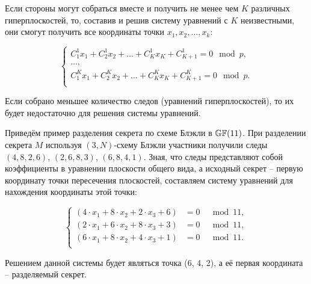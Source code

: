 Если стороны могут собраться вместе и получить не менее чем $K$ различных гиперплоскостей, то, составив и решив систему уравнений с $K$ неизвестными, они смогут получить все координаты точки $x_1, x_2, \dots, x_k$:

\[ \left\{ \begin{array}{l}
    C^1_1 x_1 + C^1_2 x_2 + \dots + C^1_K x_K + C^1_{K+1} = 0 \mod p, \\
    \dots, \\
    C^K_1 x_1 + C^K_2 x_2 + \dots + C^K_K x_K + C^K_{K+1} = 0 \mod p. \\
\end{array} \right. \]

Если собрано меньшее количество следов (уравнений гиперплоскостей), то их будет недостаточно для решения системы уравнений.

\example
Приведём пример разделения секрета по схеме Блэкли в $\mathbb{GF}(11)$. При разделении секрета $M$ используя $(3,N)$-схему Блэкли участники получили следы $(4, 8, 2, 6)$, $(2, 6, 8, 3)$, $(6, 8, 4, 1)$. Зная, что следы представляют собой коэффициенты в уравнении плоскости общего вида, а исходный секрет -- первую координату точки пересечения плоскостей, составляем систему уравнений для нахождения координаты этой точки:

\[ \left\{\begin{aligned}
   \left( 4\cdot x_1 + 8\cdot x_2 + 2\cdot x_3 + 6 \right) &= 0 &\mod 11,  \\
   \left( 2\cdot x_1 + 6\cdot x_2 + 8\cdot x_3 + 3 \right) &= 0 &\mod 11,  \\
   \left( 6\cdot x_1 + 8\cdot x_2 + 4\cdot x_3 + 1 \right) &= 0 &\mod 11.  \\
\end{aligned} \right. \]

Решением данной системы будет являться точка (6, 4, 2), а её первая координата -- разделяемый секрет.
\exampleend

